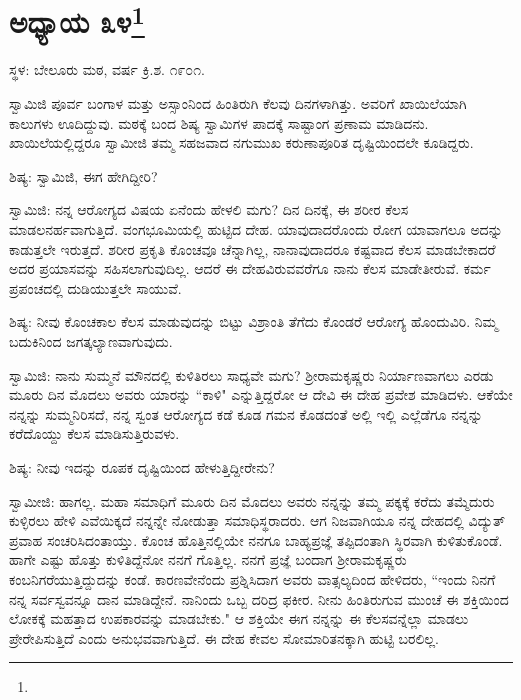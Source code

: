 \newpage

\chapter[ಅಧ್ಯಾಯ ೩೪]{ಅಧ್ಯಾಯ ೩೪\protect\footnote{}}

\begin{center}
ಸ್ಥಳ: ಬೇಲೂರು ಮಠ, ವರ್ಷ ಕ್ರಿ.ಶ. ೧೯೦೧.
\end{center}

ಸ್ವಾಮಿಜಿ ಪೂರ್ವ ಬಂಗಾಳ ಮತ್ತು ಅಸ್ಸಾಂನಿಂದ ಹಿಂತಿರುಗಿ ಕೆಲವು ದಿನಗಳಾಗಿತ್ತು. ಅವರಿಗೆ ಖಾಯಿಲೆಯಾಗಿ ಕಾಲುಗಳು ಊದಿದ್ದುವು. ಮಠಕ್ಕೆ ಬಂದ ಶಿಷ್ಯ ಸ್ವಾಮಿಗಳ ಪಾದಕ್ಕೆ ಸಾಷ್ಟಾಂಗ ಪ್ರಣಾಮ ಮಾಡಿದನು. ಖಾಯಿಲೆಯಲ್ಲಿದ್ದರೂ ಸ್ವಾಮೀಜಿ ತಮ್ಮ ಸಹಜವಾದ ನಗುಮುಖ ಕರುಣಾಪೂರಿತ ದೃಷ್ಟಿಯಿಂದಲೇ ಕೂಡಿದ್ದರು.

ಶಿಷ್ಯ: ಸ್ವಾಮಿಜಿ, ಈಗ ಹೇಗಿದ್ದೀರಿ?

ಸ್ವಾಮಿಜಿ: ನನ್ನ ಆರೋಗ್ಯದ ವಿಷಯ ಏನೆಂದು ಹೇಳಲಿ ಮಗು? ದಿನ ದಿನಕ್ಕೆ, ಈ ಶರೀರ ಕೆಲಸ ಮಾಡಲನರ್ಹವಾಗುತ್ತಿದೆ. ವಂಗಭೂಮಿಯಲ್ಲಿ ಹುಟ್ಟಿದ ದೇಹ. ಯಾವುದಾದರೊಂದು ರೋಗ ಯಾವಾಗಲೂ ಅದನ್ನು ಕಾಡುತ್ತಲೇ ಇರುತ್ತದೆ. ಶರೀರ ಪ್ರಕೃತಿ ಕೊಂಚವೂ ಚೆನ್ನಾಗಿಲ್ಲ, ನಾನಾವುದಾದರೂ ಕಷ್ಟವಾದ ಕೆಲಸ ಮಾಡಬೇಕಾದರೆ ಅದರ ಪ್ರಯಾಸವನ್ನು ಸಹಿಸಲಾಗುವುದಿಲ್ಲ. ಆದರೆ ಈ ದೇಹವಿರುವವರೆಗೂ ನಾನು ಕೆಲಸ ಮಾಡೇತೀರುವೆ. ಕರ್ಮ ಪ್ರಪಂಚದಲ್ಲಿ ದುಡಿಯುತ್ತಲೇ ಸಾಯುವೆ.

ಶಿಷ್ಯ: ನೀವು ಕೊಂಚಕಾಲ ಕೆಲಸ ಮಾಡುವುದನ್ನು ಬಿಟ್ಟು ವಿಶ್ರಾಂತಿ ತೆಗೆದು ಕೊಂಡರೆ ಆರೋಗ್ಯ ಹೊಂದುವಿರಿ. ನಿಮ್ಮ ಬದುಕಿನಿಂದ ಜಗತ್ಕಲ್ಯಾಣವಾಗುವುದು.

ಸ್ವಾಮಿಜಿ: ನಾನು ಸುಮ್ಮನೆ ಮೌನದಲ್ಲಿ ಕುಳಿತಿರಲು ಸಾಧ್ಯವೇ ಮಗು? ಶ‍್ರೀರಾಮಕೃಷ್ಣರು ನಿರ್ಯಾಣವಾಗಲು ಎರಡು ಮೂರು ದಿನ ಮೊದಲು ಅವರು ಯಾರನ್ನು “ಕಾಳಿ" ಎನ್ನುತ್ತಿದ್ದರೋ ಆ ದೇವಿ ಈ ದೇಹ ಪ್ರವೇಶ ಮಾಡಿದಳು. ಆಕೆಯೇ ನನ್ನನ್ನು ಸುಮ್ಮನಿರಿಸದೆ, ನನ್ನ ಸ್ವಂತ ಆರೋಗ್ಯದ ಕಡೆ ಕೂಡ ಗಮನ ಕೊಡದಂತೆ ಅಲ್ಲಿ ಇಲ್ಲಿ ಎಲ್ಲೆಡೆಗೂ ನನ್ನನ್ನು ಕರೆದೊಯ್ದು ಕೆಲಸ ಮಾಡಿಸುತ್ತಿರುವಳು.

ಶಿಷ್ಯ: ನೀವು ಇದನ್ನು ರೂಪಕ ದೃಷ್ಟಿಯಿಂದ ಹೇಳುತ್ತಿದ್ದೀರೇನು?

ಸ್ವಾಮೀಜಿ: ಹಾಗಲ್ಲ. ಮಹಾ ಸಮಾಧಿಗೆ ಮೂರು ದಿನ ಮೊದಲು ಅವರು ನನ್ನನ್ನು ತಮ್ಮ ಪಕ್ಕಕ್ಕೆ ಕರೆದು ತಮ್ಮೆದುರು ಕುಳ್ಳಿರಲು ಹೇಳಿ ಎವೆಯಿಕ್ಕದೆ ನನ್ನನ್ನೇ ನೋಡುತ್ತಾ ಸಮಾಧಿಸ್ಥರಾದರು. ಆಗ ನಿಜವಾಗಿಯೂ ನನ್ನ ದೇಹದಲ್ಲಿ ವಿದ್ಯುತ್ ಪ್ರವಾಹ ಸಂಚರಿಸಿದಂತಾಯ್ತು. ಕೊಂಚ ಹೊತ್ತಿನಲ್ಲಿಯೇ ನನಗೂ ಬಾಹ್ಯಪ್ರಜ್ಞೆ ತಪ್ಪಿದಂತಾಗಿ ಸ್ಥಿರವಾಗಿ ಕುಳಿತುಕೊಂಡೆ. ಹಾಗೇ ಎಷ್ಟು ಹೊತ್ತು ಕುಳಿತಿದ್ದೆನೋ ನನಗೆ ಗೊತ್ತಿಲ್ಲ. ನನಗೆ ಪ್ರಜ್ಞೆ ಬಂದಾಗ ಶ‍್ರೀರಾಮಕೃಷ್ಣರು ಕಂಬನಿಗರೆಯುತ್ತಿದ್ದುದನ್ನು ಕಂಡೆ. ಕಾರಣವೇನೆಂದು ಪ್ರಶ್ನಿಸಿದಾಗ ಅವರು ವಾತ್ಸಲ್ಯದಿಂದ ಹೇಳಿದರು, “ಇಂದು ನಿನಗೆ ನನ್ನ ಸರ್ವಸ್ವವನ್ನೂ ದಾನ ಮಾಡಿದ್ದೇನೆ. ನಾನಿಂದು ಒಬ್ಬ ದರಿದ್ರ ಫಕೀರ. ನೀನು ಹಿಂತಿರುಗುವ ಮುಂಚೆ ಈ ಶಕ್ತಿಯಿಂದ ಲೋಕಕ್ಕೆ ಮಹತ್ತಾದ ಉಪಕಾರವನ್ನು ಮಾಡಬೇಕು." ಆ ಶಕ್ತಿಯೇ ಈಗ ನನ್ನನ್ನು ಈ ಕೆಲಸವನ್ನೆಲ್ಲಾ ಮಾಡಲು ಪ್ರೇರೇಪಿಸುತ್ತಿದೆ ಎಂದು ಅನುಭವವಾಗುತ್ತಿದೆ. ಈ ದೇಹ ಕೇವಲ ಸೋಮಾರಿತನಕ್ಕಾಗಿ ಹುಟ್ಟಿ ಬರಲಿಲ್ಲ.

